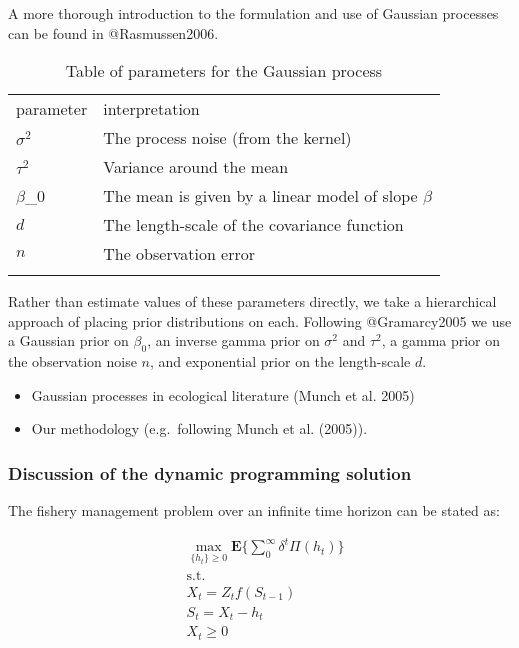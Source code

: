 \documentclass[author-year, review]{elsarticle} %
\begin{document}
A more thorough introduction to the formulation and use of Gaussian
processes can be found in @Rasmussen2006.

\begin{longtable}[c]{@{}ll@{}}
\hline\noalign{\medskip}
parameter & interpretation
\\\noalign{\medskip}
\hline\noalign{\medskip}
$\sigma^2$ & The process noise (from the kernel)
\\\noalign{\medskip}
$\tau^2$ & Variance around the mean
\\\noalign{\medskip}
$\beta$\_0 & The mean is given by a linear model of slope $\beta$
\\\noalign{\medskip}
$d$ & The length-scale of the covariance function
\\\noalign{\medskip}
$n$ & The observation error
\\\noalign{\medskip}
\hline
\noalign{\medskip}
\caption{Table of parameters for the Gaussian process}
\end{longtable}

Rather than estimate values of these parameters directly, we take a
hierarchical approach of placing prior distributions on each. Following
@Gramarcy2005 we use a Gaussian prior on $\beta_0$, an inverse gamma
prior on $\sigma^2$ and $\tau^2$, a gamma prior on the observation noise
$n$, and exponential prior on the length-scale $d$.

\begin{itemize}
\item
  Gaussian processes in ecological literature (Munch et al. 2005)
\item
  Our methodology (e.g.~following Munch et al. (2005)).
\end{itemize}

\subsubsection{Discussion of the dynamic programming solution}

The fishery management problem over an infinite time horizon can be
stated as:

\begin{align}
& \max_{ \{h_t\} \geq 0 } \mathbf{E} \lbrace \sum_0^\infty \delta^t \Pi(h_t) \rbrace \\
& \mathrm{s.t.}  \\
 & X_t = Z_t f\left(S_{t-1}\right) \\
 & S_t = X_t - h_t \\
 & X_t  \geq 0 
\end{align}
\end{document}
